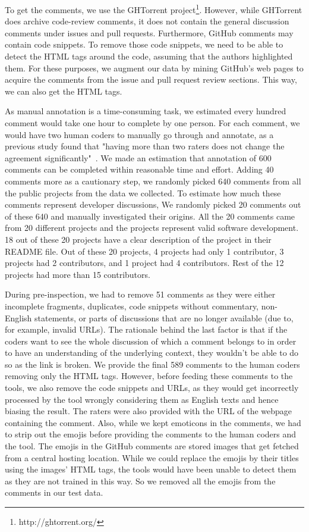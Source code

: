 To get the comments, 
we use the GHTorrent project\footnote{http://ghtorrent.org/}. However, while GHTorrent does archive code-review comments, 
it does not contain the general discussion comments 
under issues and pull requests. 
Furthermore, 
GitHub comments may contain code snippets.
To remove those code snippets, 
we need to be able to detect the HTML tags around the code, 
assuming that the authors highlighted them. 
For these purposes, 
we augment our data by mining GitHub's web pages 
to acquire the comments from the issue and pull request review sections. 
This way, we can also get the HTML tags.

As manual annotation is a time-consuming task, 
we estimated 
every hundred comment 
would take one hour to complete by one person. 
For each comment, 
we would have two human coders to 
manually go through and annotate, 
as a previous study found that 
"having more than two raters 
does not change 
the agreement significantly"~\cite{murgia2014developers}. 
We made an estimation that annotation of 600 comments 
can be completed within reasonable time and effort.
Adding 40 comments more as a cautionary step, 
we randomly picked 640 comments 
from all the public projects from the data we collected.
To estimate how much these comments
represent developer discussions,
We randomly picked 
20 comments out of these 640 
and manually investigated their origins.
All the 20 comments came from 20 different projects 
and the projects represent valid software development.
18 out of these 20 projects have a clear description 
of the project in their README file.
Out of these 20 projects, 
4 projects had only 1 contributor, 
3 projects had 2 contributors, 
and 1 project had 4 contributors.
Rest of the 12 projects had more than 15 contributors.

During pre-inspection, 
we had to remove 51 comments as they were 
either incomplete fragments, 
duplicates, 
code snippets without commentary, 
non-English statements, 
or parts of discussions that are no longer available 
(due to, for example, invalid URLs). 
The rationale behind the last factor is that 
if the coders want to see the whole discussion 
of which a comment belongs to
in order to have an understanding 
of the underlying context, 
they wouldn't be able to do so as the link is broken. 
We provide the final 589 comments to the human coders 
removing only the HTML tags. 
However, before feeding these comments to the tools, 
we also remove the code snippets and URLs, 
as they would get incorrectly processed by the tool 
wrongly considering them as English texts 
and hence biasing the result. 
The raters were also provided with the URL of the webpage 
containing the comment.
Also, while we kept emoticons in the comments, 
we had to strip out the emojis 
before providing the comments 
to the human coders and the tool.
The emojis in the GitHub comments 
are stored images 
that get fetched from a central hosting location.
While we could replace the emojis 
by their titles using the images' HTML tags, 
the tools would have been unable to detect them 
as they are not trained in this way.
So we removed all the emojis 
from the comments in our test data.


